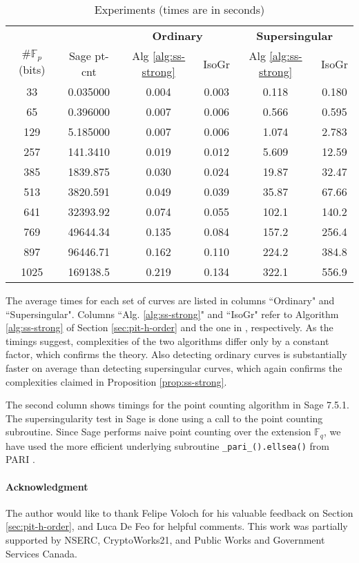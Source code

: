 \documentclass[12pt]{article}
\theoremstyle{plain}
\theoremstyle{definition}
\def\F{\ensuremath{\mathbb{F}}}
\begin{document}
\begin{table}
	\centering
	\small
	\begin{tabular}{cccccc}
		& & \multicolumn{2}{c}{\bfseries Ordinary} & \multicolumn{2}{c}{\bfseries Supersingular} \\
		\cmidrule[0.7pt](r){3-4} \cmidrule[0.7pt](l){5-6} 
		$\#\F_p$ (bits) & Sage pt-cnt & Alg \ref{alg:ss-strong} & IsoGr & Alg 
		\ref{alg:ss-strong} & IsoGr \\
		\midrule[0.7pt]
		33 & 0.035000 & 0.004 & 0.003 & 0.118 & 0.180 \\
		65 & 0.396000 &  0.007 & 0.006 & 0.566 & 0.595 \\
		129 & 5.185000 &  0.007 & 0.006 & 1.074 & 2.783 \\
		257 & 141.3410 &  0.019 & 0.012 & 5.609 & 12.59 \\
		385 & 1839.875 &  0.030 & 0.024 & 19.87 & 32.47 \\
		513 & 3820.591 &  0.049 & 0.039 & 35.87 & 67.66 \\
		641 & 32393.92 &  0.074 & 0.055 & 102.1 & 140.2 \\
		769 & 49644.34 &  0.135 & 0.084 & 157.2 & 256.4 \\
		897 & 96446.71 &  0.162 & 0.110 & 224.2 & 384.8 \\
		1025 & 169138.5 &  0.219 & 0.134 & 322.1 & 556.9 \\		
		\midrule[0.7pt]
	\end{tabular}
	\caption{Experiments (times are in seconds)}
	\label{table:exper}
\end{table}

The average times for each set of curves are listed in columns ``Ordinary" and ``Supersingular". 
Columns ``Alg. \ref{alg:ss-strong}" and ``IsoGr" refer to Algorithm \ref{alg:ss-strong} of Section 
\ref{sec:pit-h-order} and the one in \cite{sutherland2012}, respectively. As the timings suggest, 
complexities of the two algorithms differ only by a constant factor, which confirms the theory. 
Also detecting ordinary curves is substantially faster on average than detecting supersingular 
curves, which again confirms the complexities claimed in Proposition \ref{prop:ss-strong}. 

The second column shows timings for the point counting algorithm in Sage 7.5.1. The 
supersingularity test in Sage is done using a call to the point counting subroutine. Since Sage 
performs naive point counting over the extension $\F_q$, we have used the more efficient underlying 
subroutine \verb|_pari_().ellsea()| from PARI \cite{Pari}. 

\paragraph{Acknowledgment}
The author would like to thank Felipe Voloch for his valuable feedback on Section 
\ref{sec:pit-h-order}, and Luca De Feo for helpful comments. This work was partially supported by 
NSERC, CryptoWorks21, and Public Works and Government Services Canada.






\end{document}
